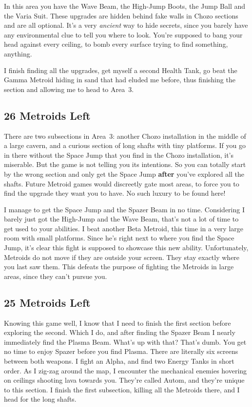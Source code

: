 \documentclass{book}
\begin{document}
In this area you have the Wave Beam, the High-Jump Boots, the Jump Ball and the Varia Suit. These upgrades are hidden behind fake walls in Chozo sections and are all optional. It’s a very \emph{ancient} way to hide secrets, since you barely have any environmental clue to tell you where to look. You’re supposed to bang your head against every ceiling, to bomb every surface trying to find something, anything.

I finish finding all the upgrades, get myself a second Health Tank, go beat the Gamma Metroid hiding in sand that had eluded me before, thus finishing the section and allowing me to head to Area 3.

\subsection*{26 Metroids Left}\nopagebreak[4]

There are two subsections in Area 3: another Chozo installation in the middle of a large cavern, and a curious section of long shafts with tiny platforms. If you go in there without the Space Jump that you find in the Chozo installation, it’s miserable. But the game is not telling you its intentions. So you can totally start by the wrong section and only get the Space Jump \textbf{after} you’ve explored all the shafts. Future Metroid games would discreetly gate most areas, to force you to find the upgrade they want you to have. No such luxury to be found here!

I manage to get the Space Jump and the Spazer Beam in no time. Considering I barely just got the High-Jump and the Wave Beam, that’s not a lot of time to get used to your abilities. I beat another Beta Metroid, this time in a very large room with small platforms. Since he’s right next to where you find the Space Jump, it’s clear this fight is supposed to showcase this new ability. Unfortunately, Metroids do not move if they are outside your screen. They stay exactly where you last saw them. This defeats the purpose of fighting the Metroids in large areas, since they can’t pursue you.

\subsection*{25 Metroids Left}\nopagebreak[4]

Knowing this game well, I know that I need to finish the first section before exploring the second. Which I do, and after finding the Spazer Beam I nearly immediately find the Plasma Beam. What’s up with that? That’s dumb. You get no time to enjoy Spazer before you find Plasma. There are literally six screens between both weapons. I fight an Alpha, and find two Energy Tanks in short order. As I zig-zag around the map, I encounter the mechanical enemies hovering on ceilings shooting lava towards you. They’re called Autom, and they’re unique to this section. I finish the first subsection, killing all the Metroids there, and I head for the long shafts.
\end{document}
